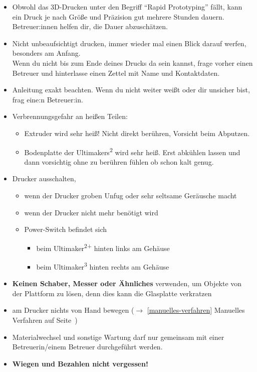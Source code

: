 \documentclass{\basedir/fablab-document}
\newcommand{\ts}[1]{\textsuperscript{#1}}
\begin{document}
\begin{itemize}
 \item Obwohl das 3D-Drucken unter den Begriff ``Rapid Prototyping'' fällt, kann ein Druck je nach Größe und
 Präzision gut mehrere Stunden dauern. Betreuer:innen helfen dir, die Dauer abzuschätzen.
 \item Nicht unbeaufsichtigt drucken, immer wieder mal einen Blick darauf werfen, besonders am Anfang.\\
Wenn du nicht bis zum Ende deines Drucks da sein kannst, frage vorher einen Betreuer und hinterlasse einen Zettel mit Name und Kontaktdaten.
 \item Anleitung exakt beachten. Wenn du nicht weiter weißt oder dir unsicher bist, frag eine:n Betreuer:in.
 \item Verbrennungsgefahr an heißen Teilen:
  \begin{itemize}
   \item Extruder wird sehr heiß! Nicht direkt berühren, Vorsicht beim Abputzen.
   \item Bodenplatte der Ultimakers\ts2 wird sehr heiß. Erst abkühlen lassen und dann vorsichtig ohne zu berühren fühlen ob schon kalt genug.
  \end{itemize}
 \item Drucker ausschalten,
 \begin{itemize}
  \item wenn der Drucker groben Unfug oder sehr seltsame Geräusche macht
  \item wenn der Drucker nicht mehr benötigt wird
  \item Power-Switch befindet sich
  \begin{itemize}
   \item beim Ultimaker\ts{2+} hinten links am Gehäuse
   \item beim Ultimaker\ts{3} hinten rechts am Gehäuse
  \end{itemize}
 \end{itemize}
 \item \textbf{Keinen Schaber, Messer oder Ähnliches} verwenden, um Objekte von der Plattform zu lösen, denn dies kann die Glasplatte verkratzen
 \item am Drucker nichts von Hand bewegen ($\to$ \ref{manuelles-verfahren} Manuelles Verfahren auf Seite\, \pageref{manuelles-verfahren})
 \item Materialwechsel und sonstige Wartung darf nur gemeinsam mit einer Betreuerin/einem Betreuer durchgeführt werden.
 \item \textbf{Wiegen und Bezahlen nicht vergessen!}
\end{itemize}
\newpage
\end{document}

